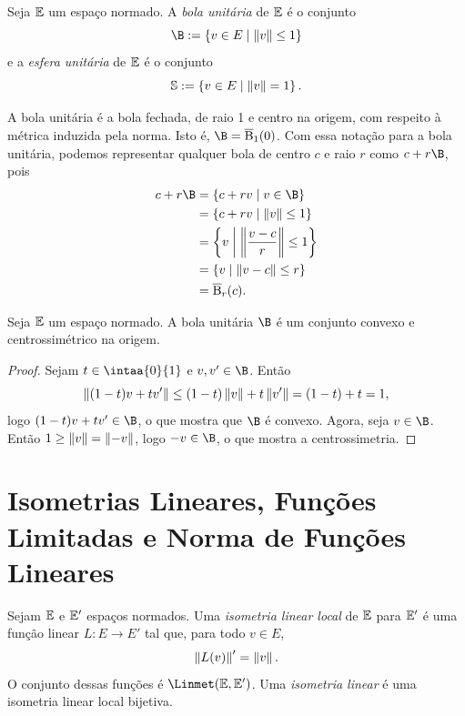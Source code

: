 \begin{defi}
Seja $\mathbb{E}$ um espaço normado. A \emph{bola unitária} de $\mathbb{E}$ é o conjunto
	\begin{equation*}
	\B := \set{v \in E}{\nor{v} \leq 1}
	\end{equation*}
e a \emph{esfera unitária} de $\mathbb{E}$ é o conjunto
	\begin{equation*}
	\mathbb{S} := \left\{v \in E \;\middle\vert\; \left\Vert{v}\right\Vert = 1 \right\}.
	\end{equation*}
\end{defi}

A bola unitária é a bola fechada, de raio 1 e centro na origem, com respeito à métrica induzida pela norma. Isto é, $\B = \overline\bola_1(0)$. Com essa notação para a bola unitária, podemos representar qualquer bola de centro $c$ e raio $r$ como $c+r\B$, pois
	\begin{align*}
	c+r\B &= \set{c+rv}{v \in \B} \\
		&= \set{c+rv}{\nor{v} \leq 1} \\
		&= \set{v}{\nor{\frac{v-c}{r}} \leq 1} \\
		&= \set{v}{\nor{v-c} \leq r} \\
		&= \overline\bola_r(c).
	\end{align*}

\begin{prop}
Seja $\mathbb{E}$ um espaço normado. A bola unitária $\B$ é um conjunto convexo e centrossimétrico na origem.
\end{prop}
\begin{proof}
Sejam $t \in \intaa{0}{1}$ e $v,v' \in \B$. Então
	\begin{equation*}
	\left\Vert{(1-t)v+tv'}\right\Vert \leq (1-t)\left\Vert{v}\right\Vert+t\left\Vert{v'}\right\Vert =(1-t)+t=1,
	\end{equation*}
logo $(1-t)v+tv' \in \B$, o que mostra que $\B$ é convexo. Agora, seja $v \in \B$. Então $1 \geq \left\Vert{v}\right\Vert = \left\Vert{-v}\right\Vert$, logo $-v \in \B$, o que mostra a centrossimetria.
\end{proof}


\section{Isometrias Lineares, Funções Limitadas e Norma de Funções Lineares}

\begin{defi}
Sejam $\mathbb{E}$ e $\mathbb{E}'$ espaços normados. Uma \emph{isometria linear local} de $\mathbb{E}$ para $\mathbb{E}'$ é uma função linear $L\colon E \to E'$ tal que, para todo $v \in E$,
	\begin{equation*}
	\left\Vert{L(v)}\right\Vert' = \left\Vert{v}\right\Vert.
	\end{equation*}
O conjunto dessas funções é $\Linmet(\E,\E')$. Uma \emph{isometria linear} é uma isometria linear local bijetiva.
\end{defi}

